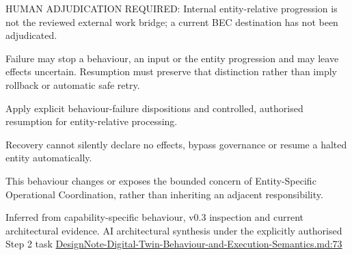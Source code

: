 HUMAN ADJUDICATION REQUIRED: Internal entity-relative progression is not the reviewed external work bridge; a current BEC destination has not been adjudicated.



Failure may stop a behaviour, an input or the entity progression and may leave effects uncertain. Resumption must preserve that distinction rather than imply rollback or automatic safe retry.



Apply explicit behaviour-failure dispositions and controlled, authorised resumption for entity-relative processing.



Recovery cannot silently declare no effects, bypass governance or resume a halted entity automatically.



This behaviour changes or exposes the bounded concern of Entity-Specific Operational Coordination, rather than inheriting an adjacent responsibility.


Inferred from capability-specific behaviour, v0.3 inspection and current architectural evidence. AI architectural synthesis under the explicitly authorised Step 2 task \hyperref[evidence:ec6250f7cf7c29a5]{DesignNote-Digital-Twin-Behaviour-and-Execution-Semantics.md:73}
